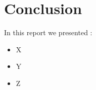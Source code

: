 \chapter{Conclusion}
In this report we presented :
\begin{itemize}
	\item X
	\item Y
	\item Z
\end{itemize}
